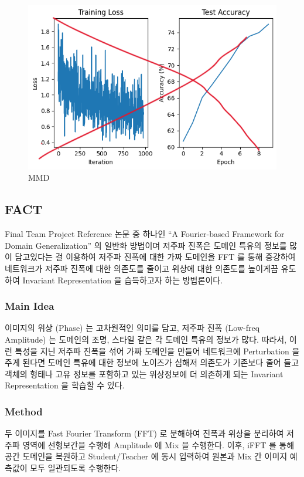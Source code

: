 \begin{figure}[h]
  \centering
  \includegraphics[width=\linewidth]{images/temp.png}
  \caption{MMD}
  \label{fig:MMD1}
\end{figure}

\subsection{FACT}
Final Team Project Reference 논문 중 하나인 “A Fourier-based Framework for Domain 
Generalization” 의 일반화 방법이며 저주파 진폭은 도메인 특유의 정보를 많이 담고있다는 걸 이용하여 
저주파 진폭에 대한 가짜 도메인을 FFT 를 통해 증강하여 네트워크가 저주파 진폭에 대한 의존도를 줄이고 
위상에 대한 의존도를 높이게끔 유도하여 Invariant Representation 을 습득하고자 하는 방법론이다.

\subsubsection{Main Idea}
이미지의 위상 (Phase) 는 고차원적인 의미를 담고, 저주파 진폭 (Low-freq Amplitude) 는 
도메인의 조명, 스타일 같은 각 도메인 특유의 정보가 많다. 따라서, 이런 특성을 지닌 저주파 진폭을 
섞어 가짜 도메인을 만들어 네트워크에 Perturbation 을 주게 된다면 도메인 특유에 대한 정보에 노이즈가 
심해져 의존도가 기존보다 줄어 들고 객체의 형태나 고유 정보를 포함하고 있는 위상정보에 더 의존하게 
되는 Invariant Representation 을 학습할 수 있다.

\subsubsection{Method}
두 이미지를 Fast Fourier Transform (FFT) 로 분해하여 진폭과 위상을 분리하여 저주파 영역에 
선형보간을 수행해 Amplitude 에 Mix 을 수행한다. 이후, iFFT 를 통해 공간 도메인을 복원하고 
Student/Teacher 에 동시 입력하여 원본과 Mix 간 이미지 예측값이 모두 일관되도록 수행한다.

